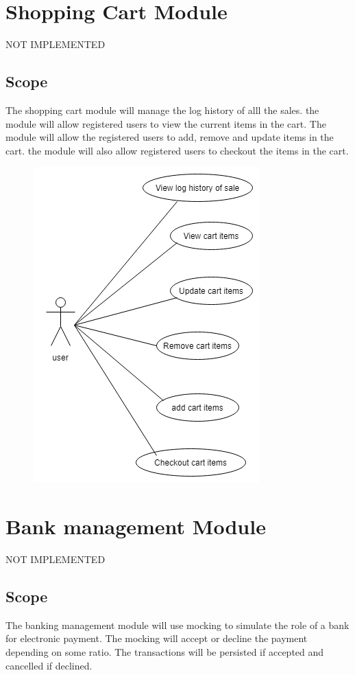 \documentclass[12pt]{article}
\begin{document}
\section{Shopping Cart Module} NOT IMPLEMENTED
\subsection{Scope}
The shopping cart module  will manage the log history  of alll the sales. the module will allow registered users to view the current items in the cart. The module will allow the registered users to add, remove and update items in the cart. the module will also allow registered users to checkout the items in the cart.
\begin{figure}[h]
\centering
\includegraphics[scale=0.7]{diagrams/cart.png}
\end{figure}
\section{Bank management  Module} NOT IMPLEMENTED
\subsection{Scope}
The banking management module will  use mocking to simulate the role of a  bank for electronic payment. The mocking will accept or decline the payment depending on some ratio. The transactions will be persisted if accepted and cancelled if declined.
\end{document}
